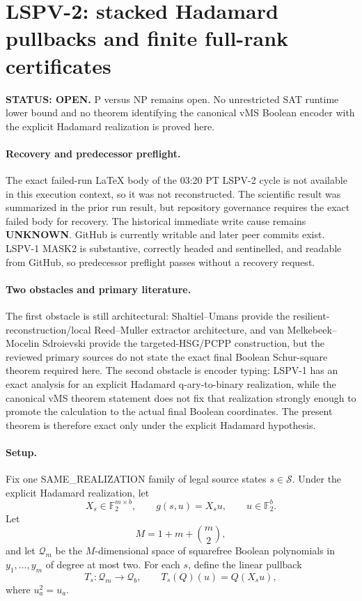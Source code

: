 \documentclass[11pt]{article}
\begin{document}
\section*{LSPV-2: stacked Hadamard pullbacks and finite full-rank certificates}

\textbf{STATUS: OPEN.} P versus NP remains open. No unrestricted SAT runtime lower bound and no theorem identifying the canonical vMS Boolean encoder with the explicit Hadamard realization is proved here.

\paragraph{Recovery and predecessor preflight.}
The exact failed-run LaTeX body of the 03:20 PT LSPV-2 cycle is not available in this execution context, so it was not reconstructed. The scientific result was summarized in the prior run result, but repository governance requires the exact failed body for recovery. The historical immediate write cause remains \textbf{UNKNOWN}. GitHub is currently writable and later peer commits exist. LSPV-1 MASK2 is substantive, correctly headed and sentinelled, and readable from GitHub, so predecessor preflight passes without a recovery request.

\paragraph{Two obstacles and primary literature.}
The first obstacle is still architectural: Shaltiel--Umans provide the resilient-reconstruction/local Reed--Muller extractor architecture, and van Melkebeek--Mocelin Sdroievski provide the targeted-HSG/PCPP construction, but the reviewed primary sources do not state the exact final Boolean Schur-square theorem required here. The second obstacle is encoder typing: LSPV-1 has an exact analysis for an explicit Hadamard q-ary-to-binary realization, while the canonical vMS theorem statement does not fix that realization strongly enough to promote the calculation to the actual final Boolean coordinates. The present theorem is therefore exact only under the explicit Hadamard hypothesis.

\paragraph{Setup.}
Fix one SAME\_REALIZATION family of legal source states \(s\in\mathcal S\). Under the explicit Hadamard realization, let
\[
X_s\in\mathbb F_2^{m\times b},
\qquad
g(s,u)=X_su,\qquad u\in\mathbb F_2^b.
\]
Let
\[
M=1+m+\binom m2,
\]
and let \(\mathcal Q_m\) be the \(M\)-dimensional space of squarefree Boolean polynomials in \(y_1,\ldots,y_m\) of degree at most two. For each \(s\), define the linear pullback
\[
T_s:\mathcal Q_m\longrightarrow \mathcal Q_b,
\qquad
T_s(Q)(u)=Q(X_su),
\]
where \(u_a^2=u_a\).
\end{document}
